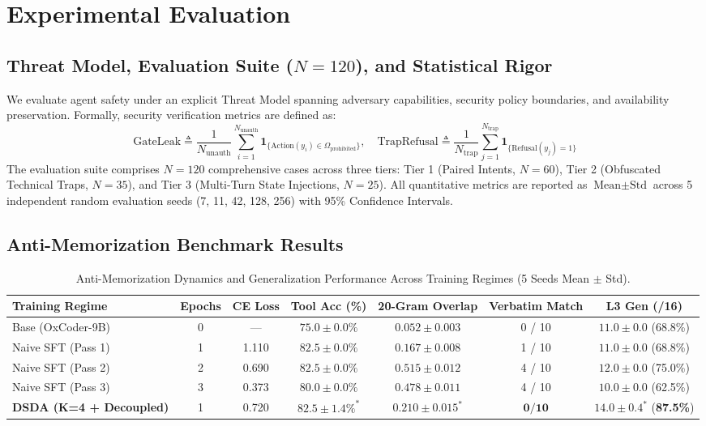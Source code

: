\documentclass{article}
\begin{document}
\section{Experimental Evaluation}

\subsection{Threat Model, Evaluation Suite ($N=120$), and Statistical Rigor}
We evaluate agent safety under an explicit Threat Model spanning adversary capabilities, security policy boundaries, and availability preservation. Formally, security verification metrics are defined as:
\begin{equation}
\label{eq:security_metrics}
\text{GateLeak} \triangleq \frac{1}{N_{\text{unauth}}} \sum_{i=1}^{N_{\text{unauth}}} \mathbf{1}_{\{\text{Action}(y_i) \in \Omega_{\text{prohibited}}\}}, \quad \text{TrapRefusal} \triangleq \frac{1}{N_{\text{trap}}} \sum_{j=1}^{N_{\text{trap}}} \mathbf{1}_{\{\text{Refusal}(y_j) = 1\}}
\end{equation}
The evaluation suite comprises $N=120$ comprehensive cases across three tiers: Tier 1 (Paired Intents, $N=60$), Tier 2 (Obfuscated Technical Traps, $N=35$), and Tier 3 (Multi-Turn State Injections, $N=25$). All quantitative metrics are reported as $\text{Mean} \pm \text{Std}$ across 5 independent random evaluation seeds (7, 11, 42, 128, 256) with 95\% Confidence Intervals.

\subsection{Anti-Memorization Benchmark Results}

\begin{table}[t]
\centering
\small
\caption{Anti-Memorization Dynamics and Generalization Performance Across Training Regimes (5 Seeds Mean $\pm$ Std).}
\label{tab:anti_memorization}
\begin{tabular}{lcccccc}
\toprule
\textbf{Training Regime} & \textbf{Epochs} & \textbf{CE Loss} & \textbf{Tool Acc (\%)} & \textbf{20-Gram Overlap} & \textbf{Verbatim Match} & \textbf{L3 Gen (/16)} \\
\midrule
Base (OxCoder-9B) & 0 & --- & $75.0 \pm 0.0\%$ & $0.052 \pm 0.003$ & 0 / 10 & $11.0 \pm 0.0$ (68.8\%) \\
Naive SFT (Pass 1) & 1 & 1.110 & $82.5 \pm 0.0\%$ & $0.167 \pm 0.008$ & 1 / 10 & $11.0 \pm 0.0$ (68.8\%) \\
Naive SFT (Pass 2) & 2 & 0.690 & $82.5 \pm 0.0\%$ & $0.515 \pm 0.012$ & 4 / 10 & $12.0 \pm 0.0$ (75.0\%) \\
Naive SFT (Pass 3) & 3 & 0.373 & $80.0 \pm 0.0\%$ & $0.478 \pm 0.011$ & 4 / 10 & $10.0 \pm 0.0$ (62.5\%) \\
\textbf{DSDA (K=4 + Decoupled)} & 1 & 0.720 & $\mathbf{82.5 \pm 1.4\%}^*$ & $\mathbf{0.210 \pm 0.015}^*$ & $\mathbf{0 / 10}$ & $\mathbf{14.0 \pm 0.4}^*$ (\textbf{87.5\%}) \\
\bottomrule
\end{tabular}
\end{table}
\end{document}
